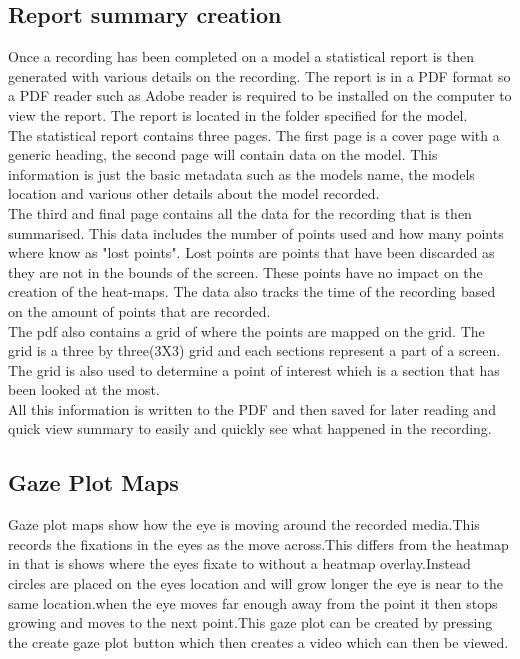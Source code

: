 \subsection{Report summary creation}
Once a recording has been completed on a model a statistical report is then generated with various details on the recording. The report is in a PDF format so a PDF reader such as Adobe reader is required to be installed on the computer to view the report. The report is located in the folder specified for the model.\\
The statistical report contains three pages. The first page is a cover page with a generic heading, the second page will contain data on the model. This information is just the basic metadata such as the models name, the models location and various other details about the model recorded.\\
The third and final page contains all the data for the recording that is then summarised. This data includes the number of points used and how many points where know as "lost points". Lost points are points that have been discarded as they are not in the bounds of the screen. These points have no impact on the creation of the heat-maps. The data also tracks the time of the recording based on the amount of points that are recorded.\\
The pdf also contains a grid of where the points are mapped on the grid. The grid is a three by three(3X3) grid and each sections represent a part of a screen. The grid is also used to determine a point of interest which is a section that has been looked at the most.\\
All this information is written to the PDF and then saved for later reading and quick view summary to easily and quickly see what happened in the recording. \\
\subsection{Gaze Plot Maps}
Gaze plot maps show how the eye is moving around the recorded media.This records the fixations in the eyes as the move across.This differs from the heatmap in that is shows where the eyes fixate to without a heatmap overlay.Instead circles are placed on the eyes location and will grow longer the eye is near to the same location.when the eye moves far enough away from the point it then stops growing and moves to the next point.This gaze plot can be created by pressing the create gaze plot button which then creates a video which can then be viewed. 
\iffalse
